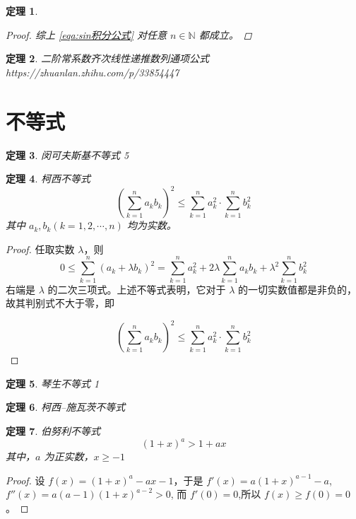 \documentclass{ctexart}
\numberwithin{equation}{section}    %
\newtheorem{theorem}{定理}
\begin{document}
\begin{theorem}
\begin{proof}
综上 \eqref{eqa:sin积分公式} 对任意 $n\in\mathbb{N}$ 都成立。
\end{proof}
\end{theorem}

\begin{theorem}{二阶常系数齐次线性递推数列通项公式}
https://zhuanlan.zhihu.com/p/33854447
\end{theorem}

\section{不等式}
\begin{theorem}{闵可夫斯基不等式}
    5
\end{theorem}
\begin{theorem}{柯西不等式}
\begin{equation}
    \left(\sum_{k=1}^na_kb_k\right)^2\leqslant\sum_{k=1}^na_k^2\cdot\sum_{k=1}^nb_k^2
\end{equation}
其中 $a_k,b_k(k=1,2,\cdots,n)$ 均为实数。
\end{theorem}
\begin{proof}
    任取实数 $\lambda$，则
\begin{equation}
    0\leqslant\sum_{k=1}^n(a_k+\lambda b_k)^2=\sum_{k=1}^na_k^2+2\lambda\sum_{k=1}^na_kb_k+\lambda^2\sum_{k=1}^nb_k^2
\end{equation}
右端是 $\lambda$ 的二次三项式。上述不等式表明，它对于 $\lambda$ 的一切实数值都是非负的，故其判别式不大于零，即

\begin{equation}
    \left(\sum_{k=1}^na_kb_k\right)^2\leqslant\sum_{k=1}^na_k^2\cdot\sum_{k=1}^nb_k^2
\end{equation}
\end{proof}
\begin{theorem}{琴生不等式}
    1
\end{theorem}
\begin{theorem}{柯西–施瓦茨不等式}
    
\end{theorem}
\begin{theorem}{伯努利不等式}
   \begin{equation}
    (1+x)^{a}> 1+ax
   \end{equation}
其中，$a$ 为正实数，$x\geqslant-1$
\end{theorem}
\begin{proof}
    设 $f(x)=(1+x)^a-ax-1$，于是 $f'(x)=a(1+x)^{a-1}-a$,$f''(x)=a(a-1)(1+x)^{a-2}>0$, 而 $f'(0)=0$,所以 $f(x)\geqslant f(0)=0$。
\end{proof}
\end{document}

